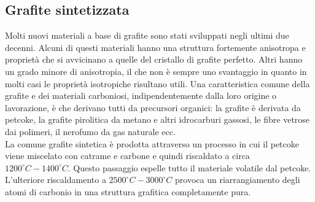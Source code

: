 \documentclass[a4paper,titlepage]{book}
\begin{document}
\subsection{Grafite sintetizzata}
Molti nuovi materiali a base di grafite sono stati sviluppati negli ultimi due decenni. Alcuni di questi materiali hanno una struttura fortemente anisotropa e proprietà che si avvicinano a quelle del cristallo di grafite perfetto. Altri hanno un grado minore di anisotropia, il che non è sempre uno svantaggio in quanto in molti casi le proprietà isotropiche risultano utili.
Una caratteristica comune della grafite e dei materiali carboniosi, indipendentemente dalla loro origine o lavorazione, è che derivano tutti da precursori organici: la grafite è derivata da petcoke, la grafite pirolitica da metano e altri idrocarburi gassosi, le fibre vetrose dai polimeri, il nerofumo da gas naturale ecc. \\
La comune grafite sintetica è prodotta attraverso un processo in cui il petcoke viene miscelato con catrame e carbone e quindi riscaldato a circa $1200 ^\circ C - 1400 ^\circ C$. Questo passaggio espelle tutto il materiale volatile dal petcoke. L'ulteriore riscaldamento a $2500 ^\circ C - 3000 ^\circ C$ provoca un riarrangiamento degli atomi di carbonio in una struttura grafitica completamente pura.
\end{document}
